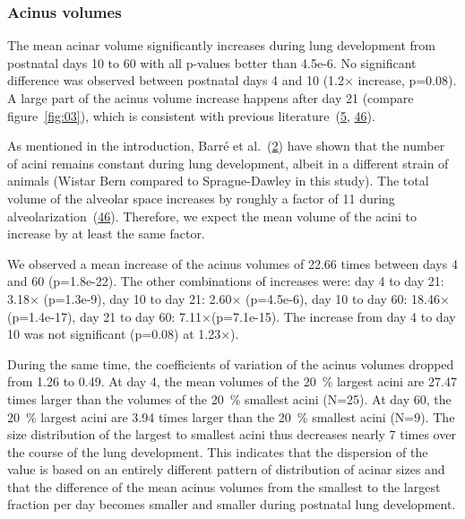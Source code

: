 \documentclass[
  american,
]{article}
\begin{document}
\hypertarget{acinus-volumes}{%
\subsubsection{Acinus volumes}\label{acinus-volumes}}

The mean acinar volume significantly increases during lung development from postnatal days 10 to 60 with all p-values better than 4.5e-6.
No significant difference was observed between postnatal days 4 and 10 (1.2× increase, p=0.08).
A large part of the acinus volume increase happens after day 21 (compare figure~\ref{fig:03}), which is consistent with previous literature~(\protect\hyperlink{ref-auNiE56G}{5}, \protect\hyperlink{ref-wnl86DEM}{46}).

As mentioned in the introduction, Barré et al.~(\protect\hyperlink{ref-14OP85b2F}{2}) have shown that the number of acini remains constant during lung development, albeit in a different strain of animals (Wistar Bern compared to Sprague-Dawley in this study).
The total volume of the alveolar space increases by roughly a factor of 11 during alveolarization~(\protect\hyperlink{ref-wnl86DEM}{46}).
Therefore, we expect the mean volume of the acini to increase by at least the same factor.

We observed a mean increase of the acinus volumes of 22.66 times between days 4 and 60 (p=1.8e-22).
The other combinations of increases were: day 4 to day 21: 3.18× (p=1.3e-9), day 10 to day 21: 2.60× (p=4.5e-6), day 10 to day 60: 18.46× (p=1.4e-17), day 21 to day 60: 7.11×(p=7.1e-15).
The increase from day 4 to day 10 was not significant (p=0.08) at 1.23×).

During the same time, the coefficients of variation of the acinus volumes dropped from 1.26 to 0.49.
At day 4, the mean volumes of the 20~\% largest acini are 27.47 times larger than the volumes of the 20~\% smallest acini (N=25).
At day 60, the 20~\% largest acini are 3.94 times larger than the 20~\% smallest acini (N=9).
The size distribution of the largest to smallest acini thus decreases nearly 7 times over the course of the lung development.
This indicates that the dispersion of the value is based on an entirely different pattern of distribution of acinar sizes and that the difference of the mean acinus volumes from the smallest to the largest fraction per day becomes smaller and smaller during postnatal lung development.
\end{document}
